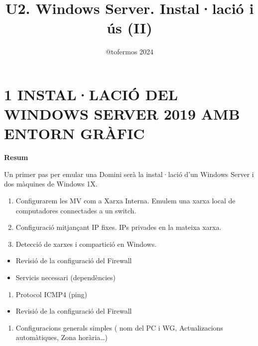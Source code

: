 \documentclass[
  a4paper,
]{article}
\title{U2. Windows Server. Instal·lació i ús (II)}
\author{@tofermos 2024}
\date{}
\providecommand{\tightlist}{%
  \setlength{\itemsep}{0pt}\setlength{\parskip}{0pt}}
\begin{document}
\maketitle

{
\setcounter{tocdepth}{2}
\tableofcontents
}
\newpage
\renewcommand\tablename{Tabla}

\section{1 INSTAL·LACIÓ DEL WINDOWS SERVER 2019 AMB ENTORN
GRÀFIC}\label{installaciuxf3-del-windows-server-2019-amb-entorn-gruxe0fic}

\textbf{Resum}

Un primer pas per emular una Domini serà la instal·lació d'un Windows
Server i dos màquines de Windows 1X.

\begin{enumerate}
\def\labelenumi{\arabic{enumi}.}
\item
  Configurarem les MV com a Xarxa Interna. Emulem una xarxa local de
  computadores connectades a un switch.
\item
  Configuració mitjançant IP fixes. IPs privades en la mateixa xarxa.
\item
  Detecció de xarxes i compartició en Windows.
\end{enumerate}

\begin{itemize}
\tightlist
\item
  Revisió de la configuració del Firewall
\item
  Servicis necessari (dependències)
\end{itemize}

\begin{enumerate}
\def\labelenumi{\arabic{enumi}.}
\setcounter{enumi}{3}
\tightlist
\item
  Protocol ICMP4 (ping)
\end{enumerate}

\begin{itemize}
\tightlist
\item
  Revisió de la configuració del Firewall
\end{itemize}

\begin{enumerate}
\def\labelenumi{\arabic{enumi}.}
\setcounter{enumi}{4}
\tightlist
\item
  Configuracions generals simples ( nom del PC i WG, Actualizacions
  automàtiques, Zona horària\ldots)
\end{enumerate}
\end{document}
